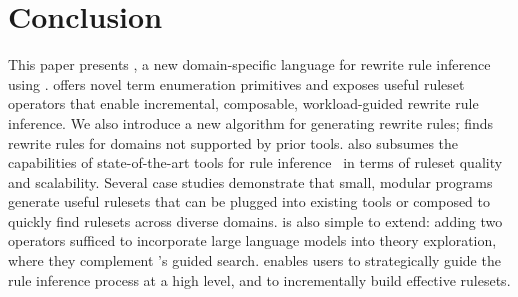 \section{Conclusion}
\label{sec:conclusion}
This paper presents \enumo, a new domain-specific language
  for rewrite rule inference using \eqsat.
\enumo offers novel term enumeration
  primitives and exposes useful ruleset operators
  that enable incremental, composable,
  workload-guided rewrite rule inference.
We also introduce a
  new \textit{\ff} algorithm for generating
  rewrite rules;
  \ff finds rewrite rules for domains not supported by
  prior tools.
\enumo also subsumes the capabilities of
  state-of-the-art tools for
  rule inference~\citep{ruler, sat19} in terms of
  ruleset quality and scalability.
Several case studies demonstrate that small, modular
  \enumo programs
  generate useful rulesets that can be plugged
  into existing \eqsat tools
  or composed to quickly find rulesets across diverse domains.
\enumo is also simple to extend:
  adding two operators sufficed to incorporate
  large language models into theory exploration,
  where they complement \enumo's guided search.
\enumo enables users
  to strategically guide the rule inference process at a high level, and
  to incrementally build effective rulesets.

